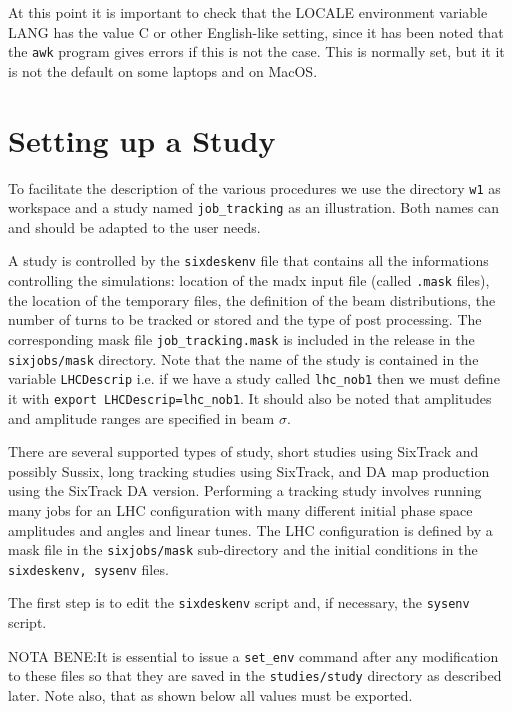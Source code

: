 \documentclass{cernatsnote}
\begin{document}
At this point it is important to check that the LOCALE environment variable
LANG has the value C or other English-like setting, since it has been noted
that the \texttt{awk} program gives errors if this is not the case. This is
normally set, but it it is not the default on some laptops and on MacOS.

\section{Setting up a Study}
\label{sec:study}

To facilitate the description of the various procedures we use the directory
\texttt{w1} as workspace and a study named \texttt{job\_tracking} as an illustration.
Both names can and should be adapted to the user needs.

A study is controlled by the \texttt{sixdeskenv} file that contains all the
informations controlling the simulations: location of the madx input file
(called \texttt{.mask} files), the location of the temporary files, the definition
of the beam distributions, the number of turns to be tracked or stored and the
type of post processing. The corresponding mask file \texttt{job\_tracking.mask}
is included in the release in the \texttt{sixjobs/mask} directory. Note that the
name of the study is contained in the variable \texttt{LHCDescrip} i.e. if we have
a study called \texttt{lhc\_nob1} then we must define it with {\tt export
LHCDescrip=lhc\_nob1}. It should also be noted that amplitudes and amplitude
ranges are specified in beam $\sigma$.

There are several supported types of study, short studies using SixTrack and
possibly Sussix, long tracking studies using SixTrack, and DA map production
using the SixTrack DA version.  Performing a tracking study involves running
many jobs for an LHC configuration with many different initial phase space
amplitudes and angles and linear tunes. The LHC configuration is defined by a
mask file in the \texttt{sixjobs/mask} sub-directory and the initial conditions
in the \texttt{sixdeskenv, sysenv} files.

The first step is to edit the \texttt{sixdeskenv} script and, if necessary, the
\texttt{sysenv} script.

NOTA BENE:It is essential to issue a \texttt{set\_env} command after any
modification to these files so that they are saved in the \texttt{studies/study}
directory as described later.  Note also, that as shown below all values must
be exported.
\end{document}
